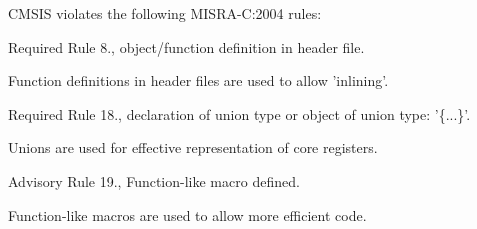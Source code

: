 C\-M\-S\-I\-S violates the following M\-I\-S\-R\-A-\/\-C\-:2004 rules\-:

\begin{DoxyItemize}
\item Required Rule 8., object/function definition in header file.\par
 Function definitions in header files are used to allow 'inlining'.\end{DoxyItemize}
\begin{DoxyItemize}
\item Required Rule 18., declaration of union type or object of union type\-: '\{...\}'.\par
 Unions are used for effective representation of core registers.\end{DoxyItemize}
\begin{DoxyItemize}
\item Advisory Rule 19., Function-\/like macro defined.\par
 Function-\/like macros are used to allow more efficient code. \end{DoxyItemize}
